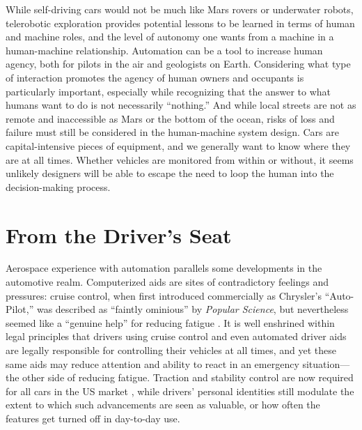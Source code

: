 While self-driving cars would not
be much like Mars rovers or underwater robots, telerobotic exploration
provides potential lessons
to be learned in terms of human and machine roles, and the level of
autonomy one wants from a machine in a human-machine relationship.
Automation can be a tool to increase 
human agency, both for pilots in the air and geologists on Earth.
Considering what type of interaction promotes the agency
of human owners and occupants is particularly important,
especially while recognizing that the answer to what humans want to do
is not necessarily ``nothing.'' And while local streets are not as
remote and inaccessible as Mars or the bottom of the ocean, risks of
loss and failure must still be considered in the human-machine system
design. Cars are capital-intensive pieces of equipment, and we
generally want to know where they are at all times. Whether vehicles
are monitored
from within or without, it seems unlikely designers will be able to
escape the need to loop the human into the decision-making process.


\section{From the Driver's Seat}

Aerospace experience with automation parallels some developments
in the automotive realm. Computerized aids are sites of contradictory
feelings and pressures: 
cruise control, when first introduced commercially as Chrysler's ``Auto-Pilot,''
was described as ``faintly
ominious'' by \emph{Popular Science}, but nevertheless seemed like a
``genuine help'' for reducing
fatigue \cite{rowsomePopsci}.
It is well enshrined within legal principles that drivers using
cruise control and even automated driver aids are legally responsible
for controlling their vehicles at all times, and yet these same aids
may reduce attention and ability to react in an emergency
situation---the other side of reducing fatigue.
Traction and stability control are now required for all cars in the US
market \cite{brookingsLiability}, while drivers' personal identities still modulate the
extent to which such
advancements are seen as valuable, or how often the features get
turned off in day-to-day use. 

